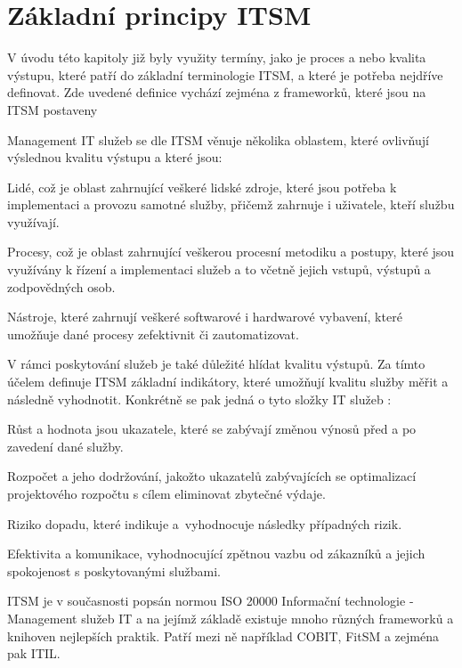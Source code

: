 \documentclass[
  digital,     %
  twoside,     %
  lof,         %
  lot,         %
]{fithesis4}
\begin{document}
\section{Základní principy ITSM}
V úvodu této kapitoly již byly využity termíny, jako je proces a nebo kvalita výstupu, které patří do základní terminologie ITSM, a které je potřeba nejdříve definovat. Zde uvedené definice vychází zejména z frameworků, které jsou na ITSM postaveny

Management IT služeb se dle ITSM věnuje několika oblastem, které ovlivňují výslednou kvalitu výstupu a které jsou:
\begin{compactitem}
  \item Lidé, což je oblast zahrnující veškeré lidské zdroje, které jsou potřeba k implementaci a provozu samotné služby, přičemž zahrnuje i uživatele, kteří službu využívají.
  \item Procesy, což je oblast zahrnující veškerou procesní metodiku a postupy, které jsou využívány k řízení a implementaci služeb a to včetně jejich vstupů, výstupů a zodpovědných osob.
  \item Nástroje, které zahrnují veškeré softwarové i hardwarové vybavení, které umožňuje dané procesy zefektivnit či zautomatizovat.
\end{compactitem}

V rámci poskytování služeb je také důležité hlídat kvalitu výstupů. Za tímto účelem definuje ITSM základní indikátory, které umožňují kvalitu služby měřit a následně vyhodnotit. Konkrétně se pak jedná o tyto složky IT služeb \parencite[s.~20]{Matula2017}:
\begin{compactitem}
\item Růst a hodnota jsou ukazatele, které se zabývají změnou výnosů před a po zavedení dané služby.
\item Rozpočet a jeho dodržování, jakožto ukazatelů zabývajících se optimalizací projektového rozpočtu s cílem eliminovat zbytečné výdaje.
\item Riziko dopadu, které indikuje a vyhodnocuje následky případných rizik.
\item Efektivita a komunikace, vyhodnocující zpětnou vazbu od zákazníků a jejich spokojenost s poskytovanými službami.
\end{compactitem}

ITSM je v současnosti popsán normou ISO 20000 Informační technologie - Management služeb IT a na jejímž základě existuje mnoho různých frameworků a knihoven nejlepších praktik. Patří mezi ně například COBIT, FitSM a zejména pak ITIL.\parencite[s.~25]{Matula2017}
\end{document}
